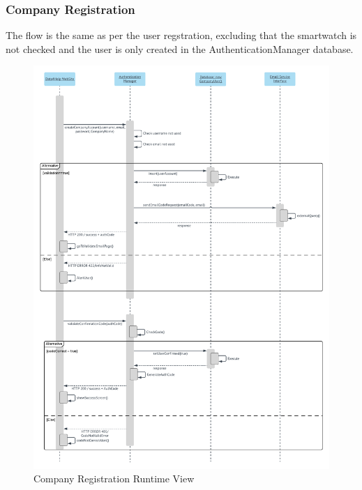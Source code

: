 \subsubsection{Company Registration}
The flow is the same as per the user regstration, excluding that the smartwatch is not checked and the user is only created in the AuthenticationManager database.
\begin{figure}[H]
	\includegraphics[width=\textwidth,height=\textheight,keepaspectratio]{assets/flowCharts/CompanyRegistration.pdf}
	\caption{Company Registration Runtime View}
	\label{fig:CompanyRegistration}
\end{figure}

